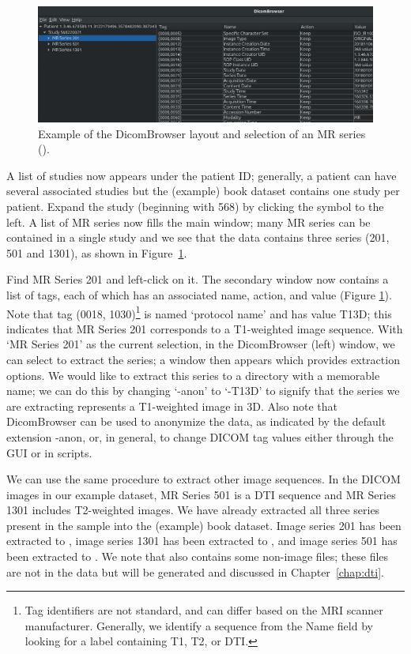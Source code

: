 \begin{figure}[h]
  \centering
  \includegraphics[width=\textwidth]{./graphics/chp2/dicombrowser-d-ext}
  \caption{Example of the DicomBrowser layout and selection of an MR series (\emp{\erniedicom}).} 
  \label{fig:chp2:dicombrwsr-scr}
\end{figure}

A list of studies now appears under the patient ID; generally, a
patient can have several associated studies but the (example) book
dataset contains one study per patient. Expand the study (beginning
with 568) by clicking the symbol to the left. A list of MR series now
fills the main window; many MR series can be contained in a single
study and we see that the \emp{\erniedicom} data contains three series
(201, 501 and 1301), as shown in Figure~\ref{fig:chp2:dicombrwsr-scr}.

Find MR Series 201 and left-click on it. The secondary window now
contains a list of tags, each of which has an associated name, action,
and value (Figure \ref{fig:chp2:dicombrwsr-scr}). Note that tag (0018,
1030)\footnote{Tag identifiers are not standard, and can differ based
  on the MRI scanner manufacturer. Generally, we identify a sequence
  from the Name field by looking for a label containing T1, T2, or
  DTI.} is named `protocol name' and has value T13D; this indicates
that MR Series 201 corresponds to a T1-weighted image sequence. With
`MR Series 201' as the current selection, in the DicomBrowser (left)
window, we can select  to extract the
series; a window then appears which provides extraction options. We
would like to extract this series to a directory with a memorable
name; we can do this by changing `-anon' to `-T13D' to signify that
the series we are extracting represents a T1-weighted image in
3D. Also note that DicomBrowser can be used to anonymize the data, as
indicated by the default extension {-anon}, or, in general, to change
DICOM tag values either through the GUI or in scripts.

We can use the same procedure to extract other image sequences. In the
DICOM images in our example dataset, MR Series 501 is a DTI sequence
and MR Series 1301 includes T2-weighted images. We have already
extracted all three series present in the sample  into
the (example) book dataset. Image series 201 has been extracted to
, image series 1301 has been extracted to
, and image series 501 has been extracted to
. We note that  also
contains some non-image files; these files are not in the
 data but will be generated and discussed in
Chapter~\ref{chap:dti}.

